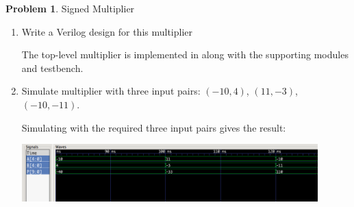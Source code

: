 \documentclass[10pt]{article}
\theoremstyle{definition}
\newtheorem{problem}{Problem}
\begin{document}
  \newpage

  \begin{problem}
    Signed Multiplier

    \begin{enumerate}
      \item Write a Verilog design for this multiplier

            The top-level multiplier is implemented in \texttt{} along with the supporting modules and testbench.

      \item Simulate multiplier with three input pairs: $(-10, 4)$, $(11, -3)$, $(-10, -11)$.

      Simulating with the required three input pairs gives the result:

      \includegraphics*[width=0.9\textwidth] {multiplier_signed_5-screenshot.png}

    \end{enumerate}
  \end{problem}

  \newpage
\end{document}
